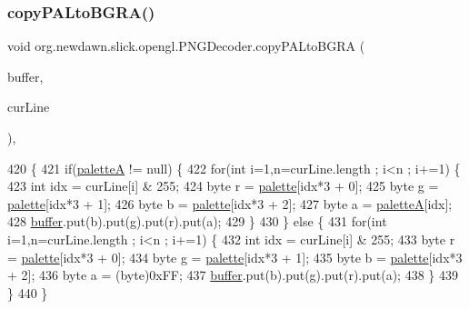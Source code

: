 \subsubsection{\texorpdfstring{copy\+P\+A\+Lto\+B\+G\+R\+A()}{copyPALtoBGRA()}}
{\footnotesize\ttfamily void org.\+newdawn.\+slick.\+opengl.\+P\+N\+G\+Decoder.\+copy\+P\+A\+Lto\+B\+G\+RA (\begin{DoxyParamCaption}\item[{Byte\+Buffer}]{buffer,  }\item[{byte \mbox{[}$\,$\mbox{]}}]{cur\+Line }\end{DoxyParamCaption})\hspace{0.3cm}{\ttfamily [inline]}, {\ttfamily [private]}}


\begin{DoxyCode}
420                                                                   \{
421         \textcolor{keywordflow}{if}(\mbox{\hyperlink{classorg_1_1newdawn_1_1slick_1_1opengl_1_1_p_n_g_decoder_a273b1728dfd1158eb001f98fd4255a58}{paletteA}} != null) \{
422             \textcolor{keywordflow}{for}(\textcolor{keywordtype}{int} i=1,n=curLine.length ; i<n ; i+=1) \{
423                 \textcolor{keywordtype}{int} idx = curLine[i] & 255;
424                 byte r = \mbox{\hyperlink{classorg_1_1newdawn_1_1slick_1_1opengl_1_1_p_n_g_decoder_ad65d46461f9f8df68a6b5551d56d8479}{palette}}[idx*3 + 0];
425                 byte g = \mbox{\hyperlink{classorg_1_1newdawn_1_1slick_1_1opengl_1_1_p_n_g_decoder_ad65d46461f9f8df68a6b5551d56d8479}{palette}}[idx*3 + 1];
426                 byte b = \mbox{\hyperlink{classorg_1_1newdawn_1_1slick_1_1opengl_1_1_p_n_g_decoder_ad65d46461f9f8df68a6b5551d56d8479}{palette}}[idx*3 + 2];
427                 byte a = \mbox{\hyperlink{classorg_1_1newdawn_1_1slick_1_1opengl_1_1_p_n_g_decoder_a273b1728dfd1158eb001f98fd4255a58}{paletteA}}[idx];
428                 \mbox{\hyperlink{classorg_1_1newdawn_1_1slick_1_1opengl_1_1_p_n_g_decoder_ae205f9222586a2bc01a8a240c5c210ad}{buffer}}.put(b).put(g).put(r).put(a);
429             \}
430         \} \textcolor{keywordflow}{else} \{
431             \textcolor{keywordflow}{for}(\textcolor{keywordtype}{int} i=1,n=curLine.length ; i<n ; i+=1) \{
432                 \textcolor{keywordtype}{int} idx = curLine[i] & 255;
433                 byte r = \mbox{\hyperlink{classorg_1_1newdawn_1_1slick_1_1opengl_1_1_p_n_g_decoder_ad65d46461f9f8df68a6b5551d56d8479}{palette}}[idx*3 + 0];
434                 byte g = \mbox{\hyperlink{classorg_1_1newdawn_1_1slick_1_1opengl_1_1_p_n_g_decoder_ad65d46461f9f8df68a6b5551d56d8479}{palette}}[idx*3 + 1];
435                 byte b = \mbox{\hyperlink{classorg_1_1newdawn_1_1slick_1_1opengl_1_1_p_n_g_decoder_ad65d46461f9f8df68a6b5551d56d8479}{palette}}[idx*3 + 2];
436                 byte a = (byte)0xFF;
437                 \mbox{\hyperlink{classorg_1_1newdawn_1_1slick_1_1opengl_1_1_p_n_g_decoder_ae205f9222586a2bc01a8a240c5c210ad}{buffer}}.put(b).put(g).put(r).put(a);
438             \}
439         \}
440     \}
\end{DoxyCode}
